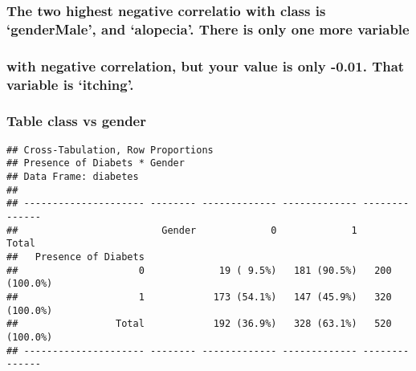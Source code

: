 \documentclass[
]{article}
\newenvironment{Shaded}{\begin{snugshade}}{\end{snugshade}}
\newcommand{\AttributeTok}[1]{\textcolor[rgb]{0.77,0.63,0.00}{#1}}
\newcommand{\FunctionTok}[1]{\textcolor[rgb]{0.00,0.00,0.00}{#1}}
\newcommand{\NormalTok}[1]{#1}
\newcommand{\SpecialCharTok}[1]{\textcolor[rgb]{0.00,0.00,0.00}{#1}}
\newcommand{\StringTok}[1]{\textcolor[rgb]{0.31,0.60,0.02}{#1}}
\begin{document}
\hypertarget{the-two-highest-negative-correlatio-with-class-is-gendermale-and-alopecia.-there-is-only-one-more-variable}{%
\subsubsection{The two highest negative correlatio with class is
`genderMale', and `alopecia'. There is only one more
variable}\label{the-two-highest-negative-correlatio-with-class-is-gendermale-and-alopecia.-there-is-only-one-more-variable}}

\hypertarget{with-negative-correlation-but-your-value-is-only--0.01.-that-variable-is-itching.}{%
\subsubsection{with negative correlation, but your value is only -0.01.
That variable is
`itching'.}\label{with-negative-correlation-but-your-value-is-only--0.01.-that-variable-is-itching.}}

\hypertarget{table-class-vs-gender}{%
\subsubsection{Table class vs gender}\label{table-class-vs-gender}}

\begin{Shaded}
\end{Shaded}

\begin{verbatim}
## Cross-Tabulation, Row Proportions  
## Presence of Diabets * Gender  
## Data Frame: diabetes  
## 
## --------------------- -------- ------------- ------------- --------------
##                         Gender             0             1          Total
##   Presence of Diabets                                                    
##                     0             19 ( 9.5%)   181 (90.5%)   200 (100.0%)
##                     1            173 (54.1%)   147 (45.9%)   320 (100.0%)
##                 Total            192 (36.9%)   328 (63.1%)   520 (100.0%)
## --------------------- -------- ------------- ------------- --------------
\end{verbatim}
\end{document}
